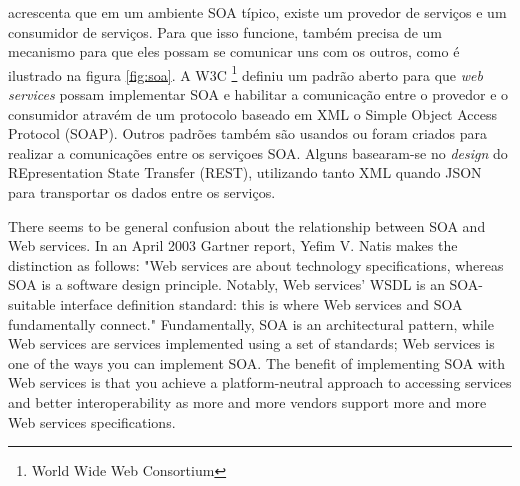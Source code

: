  acrescenta que em um ambiente SOA típico, existe um provedor de serviços e um consumidor de serviços. Para que isso funcione, também precisa de um mecanismo para que eles possam se comunicar uns com os outros, como  é ilustrado na figura \ref{fig:soa}.  A W3C \footnote{World Wide Web Consortium} definiu um padrão aberto para que \textit{web services} possam implementar SOA e habilitar a comunicação entre o provedor e o consumidor atravém de um protocolo baseado em XML o Simple Object Access Protocol (SOAP). Outros padrões também são usandos ou foram criados para realizar a comunicações entre os serviçoes SOA. Alguns basearam-se no \textit{design} do REpresentation State Transfer (REST), utilizando tanto XML quando JSON para transportar os dados entre os serviços. 

There seems to be general confusion about the relationship between SOA and Web services. In an April 2003 Gartner report, Yefim V. Natis makes the distinction as follows: "Web services are about technology specifications, whereas SOA is a software design principle. Notably, Web services' WSDL is an SOA-suitable interface definition standard: this is where Web services and SOA fundamentally connect." Fundamentally, SOA is an architectural pattern, while Web services are services implemented using a set of standards; Web services is one of the ways you can implement SOA. The benefit of implementing SOA with Web services is that you achieve a platform-neutral approach to accessing services and better interoperability as more and more vendors support more and more Web services specifications.